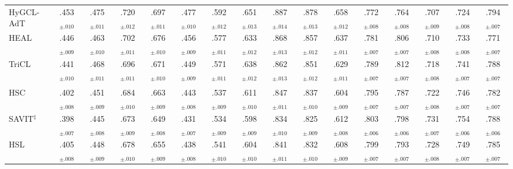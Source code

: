 \documentclass[10pt]{article}
\theoremstyle{plain}
\newcommand{\cg}[1]{\cellcolor{tierBonf}#1}
\theoremstyle{definition}
\begin{document}
\begin{table}
\begin{tabular}{l ccccc ccccc ccccc}
HyGCL-AdT
 & \cg{.453$_{\pm.010}$} & \cg{.475$_{\pm.011}$} & \cg{.720$_{\pm.012}$} & \cg{.697$_{\pm.011}$} & \cg{.477$_{\pm.010}$}
 & \cg{.592$_{\pm.012}$} & \cg{.651$_{\pm.013}$} & \cg{.887$_{\pm.014}$} & \cg{.878$_{\pm.013}$} & \cg{.658$_{\pm.012}$}
 & \cg{.772$_{\pm.008}$} & \cg{.764$_{\pm.008}$} & \cg{.707$_{\pm.009}$} & \cg{.724$_{\pm.008}$} & \cg{.794$_{\pm.007}$} \\
HEAL
 & \cg{.446$_{\pm.009}$} & \cg{.463$_{\pm.010}$} & \cg{.702$_{\pm.011}$} & \cg{.676$_{\pm.010}$} & \cg{.456$_{\pm.009}$}
 & \cg{.577$_{\pm.011}$} & \cg{.633$_{\pm.012}$} & \cg{.868$_{\pm.013}$} & \cg{.857$_{\pm.012}$} & \cg{.637$_{\pm.011}$}
 & \cg{.781$_{\pm.007}$} & \cg{.806$_{\pm.007}$} & \cg{.710$_{\pm.008}$} & \cg{.733$_{\pm.008}$} & \cg{.771$_{\pm.007}$} \\
TriCL
 & \cg{.441$_{\pm.010}$} & \cg{.468$_{\pm.011}$} & \cg{.696$_{\pm.011}$} & \cg{.671$_{\pm.010}$} & \cg{.449$_{\pm.009}$}
 & \cg{.571$_{\pm.011}$} & \cg{.638$_{\pm.012}$} & \cg{.862$_{\pm.013}$} & \cg{.851$_{\pm.012}$} & \cg{.629$_{\pm.011}$}
 & \cg{.789$_{\pm.007}$} & \cg{.812$_{\pm.007}$} & \cg{.718$_{\pm.008}$} & \cg{.741$_{\pm.007}$} & \cg{.788$_{\pm.007}$} \\
\midrule
\rowcolor{groupBar}\multicolumn{16}{l}{\textit{Pruning-based methods}} \\
HSC
 & \cg{.402$_{\pm.008}$} & \cg{.451$_{\pm.009}$} & \cg{.684$_{\pm.010}$} & \cg{.663$_{\pm.009}$} & \cg{.443$_{\pm.008}$}
 & \cg{.537$_{\pm.009}$} & \cg{.611$_{\pm.010}$} & \cg{.847$_{\pm.011}$} & \cg{.837$_{\pm.010}$} & \cg{.604$_{\pm.009}$}
 & \cg{.795$_{\pm.007}$} & \cg{.787$_{\pm.007}$} & \cg{.722$_{\pm.008}$} & \cg{.746$_{\pm.007}$} & \cg{.782$_{\pm.007}$} \\
SAVIT$^{\ddagger}$
 & \cg{.398$_{\pm.007}$} & \cg{.445$_{\pm.008}$} & \cg{.673$_{\pm.009}$} & \cg{.649$_{\pm.008}$} & \cg{.431$_{\pm.007}$}
 & \cg{.534$_{\pm.009}$} & \cg{.598$_{\pm.009}$} & \cg{.834$_{\pm.010}$} & \cg{.825$_{\pm.009}$} & \cg{.612$_{\pm.008}$}
 & \cg{.803$_{\pm.006}$} & \cg{.798$_{\pm.006}$} & \cg{.731$_{\pm.007}$} & \cg{.754$_{\pm.006}$} & \cg{.788$_{\pm.006}$} \\
HSL
 & \cg{.405$_{\pm.008}$} & \cg{.448$_{\pm.009}$} & \cg{.678$_{\pm.010}$} & \cg{.655$_{\pm.009}$} & \cg{.438$_{\pm.008}$}
 & \cg{.541$_{\pm.010}$} & \cg{.604$_{\pm.010}$} & \cg{.841$_{\pm.011}$} & \cg{.832$_{\pm.010}$} & \cg{.608$_{\pm.009}$}
 & \cg{.799$_{\pm.007}$} & \cg{.793$_{\pm.007}$} & \cg{.728$_{\pm.008}$} & \cg{.749$_{\pm.007}$} & \cg{.785$_{\pm.007}$} \\

\end{tabular}
\end{table}
\end{document}
